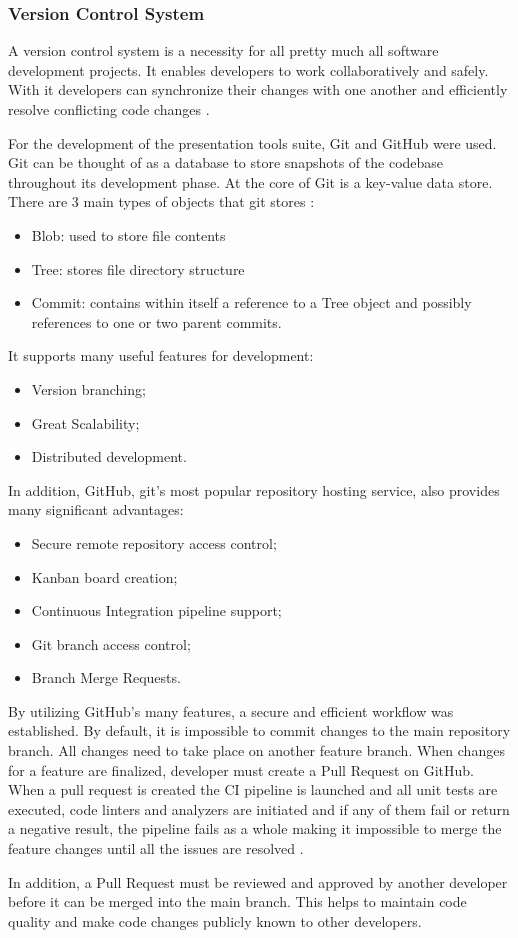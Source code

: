 \documentclass[12pt, fleqn, a4paper]{article}
\begin{document}
\subsubsection{Version Control System}
A version control system is a necessity for all pretty much all software development projects. It enables developers to work collaboratively and safely. With it developers can synchronize their changes with one another and efficiently resolve conflicting code changes \citep{loeliger_mccullough_2012}.\par
For the development of the presentation tools suite, Git and GitHub were used. 
Git can be thought of as a database to store snapshots of the codebase throughout its development phase. At the core of Git is a key-value data store. 
There are 3 main types of objects that git stores \citep{progit}:
\begin{itemize}
	\item Blob: used to store file contents
	\item Tree: stores file directory structure
	\item Commit: contains within itself a reference to a Tree object and possibly references to one or two parent commits.
\end{itemize}
It supports many useful features for development:
\begin{itemize}
	\item Version branching;
	\item Great Scalability;
	\item Distributed development.
\end{itemize}
In addition, GitHub, git's most popular repository hosting service, also provides many significant advantages:
\begin{itemize}
	\item Secure remote repository access control;
	\item Kanban board creation;
	\item Continuous Integration pipeline support;
	\item Git branch access control;
	\item Branch Merge Requests.
\end{itemize}
By utilizing GitHub's many features, a secure and efficient workflow was established. By default, it is impossible to commit changes to the main repository branch. All changes need to take place on another feature branch. When changes for a feature are finalized, developer must create a Pull Request on GitHub. When a pull request is created the CI pipeline is launched and all unit tests are executed, code linters and analyzers are initiated and if any of them fail or return a negative result, the pipeline fails as a whole making it impossible to merge the feature changes until all the issues are resolved \citep{gitteams}.\par
In addition, a Pull Request must be reviewed and approved by another developer before it can be merged into the main branch. This helps to maintain code quality and make code changes publicly known to other developers.
\end{document}
